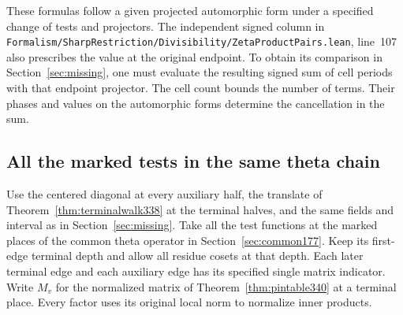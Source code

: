 \documentclass[a4paper,11pt]{article}
\theoremstyle{definition}
\theoremstyle{remark}
\newcommand{\srcloc}[2]{{\small\nolinkurl{#1.lean}}, line~#2}
\numberwithin{equation}{section}
\begin{document}
These formulas follow a given projected automorphic form under a
specified change of tests and projectors. The independent signed
column in \srcloc{Formalism/SharpRestriction/Divisibility/ZetaProductPairs}{107}
also prescribes the value at the original endpoint. To obtain its
comparison in Section~\ref{sec:missing}, one must evaluate the
resulting signed sum of cell periods with that endpoint projector.
The cell count bounds the number of terms. Their phases and values
on the automorphic forms determine the cancellation in the sum.


\subsection{All the marked tests in the same theta chain}\label{sec:markedtests341}
Use the centered diagonal at every auxiliary half, the translate of
Theorem~\ref{thm:terminalwalk338} at the terminal halves, and the
same fields and interval as in Section~\ref{sec:missing}. Take
all the test functions at the marked places of the common theta
operator in Section~\ref{sec:common177}. Keep its first-edge
terminal depth and allow all residue cosets at that depth. Each
later terminal edge and each auxiliary edge has its specified
single matrix indicator. Write $M_v$ for the normalized matrix of
Theorem~\ref{thm:pintable340} at a terminal place. Every factor
uses its original local norm to normalize inner products.
\end{document}
